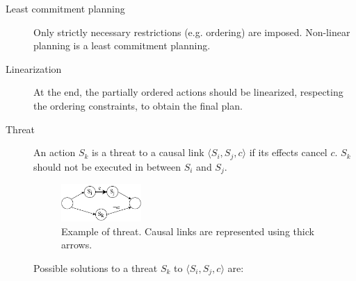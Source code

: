 \begin{description}
    \item[Least commitment planning] 
        Only strictly necessary restrictions (e.g. ordering) are imposed.
        Non-linear planning is a least commitment planning.

    \item[Linearization]  
        At the end, the partially ordered actions should be linearized, 
        respecting the ordering constraints, to obtain the final plan.
\end{description}


\begin{description}
    \item[Threat]  
        An action $S_k$ is a threat to a causal link $\langle S_i, S_j, c \rangle$ 
        if its effects cancel $c$.
        $S_k$ should not be executed in between $S_i$ and $S_j$.

        \begin{figure}[H]
            \centering
            \includegraphics[width=0.3\textwidth]{img/_threat_example.pdf}
            \caption{Example of threat. Causal links are represented using thick arrows.}
        \end{figure}

        Possible solutions to a threat $S_k$ to $\langle S_i, S_j, c \rangle$ are:
\end{description}

